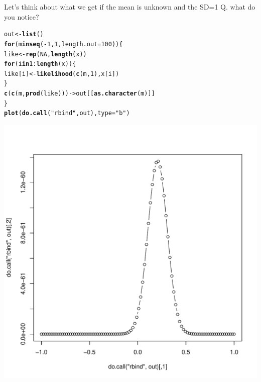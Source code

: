 \documentclass[letterpaper,12pt]{article}\usepackage[]{graphicx}\usepackage[]{color}
\makeatletter
\def\maxwidth{ %
  \ifdim\Gin@nat@width>\linewidth
    \linewidth
  \else
    \Gin@nat@width
  \fi
}
\newcommand{\hlnum}[1]{\textcolor[rgb]{0.686,0.059,0.569}{#1}}%
\newcommand{\hlstr}[1]{\textcolor[rgb]{0.192,0.494,0.8}{#1}}%
\newcommand{\hlopt}[1]{\textcolor[rgb]{0,0,0}{#1}}%
\newcommand{\hlstd}[1]{\textcolor[rgb]{0.345,0.345,0.345}{#1}}%
\newcommand{\hlkwa}[1]{\textcolor[rgb]{0.161,0.373,0.58}{\textbf{#1}}}%
\newcommand{\hlkwb}[1]{\textcolor[rgb]{0.69,0.353,0.396}{#1}}%
\newcommand{\hlkwc}[1]{\textcolor[rgb]{0.333,0.667,0.333}{#1}}%
\newcommand{\hlkwd}[1]{\textcolor[rgb]{0.737,0.353,0.396}{\textbf{#1}}}%
\newenvironment{kframe}{%
 \def\at@end@of@kframe{}%
 \ifinner\ifhmode%
  \def\at@end@of@kframe{\end{minipage}}%
  \begin{minipage}{\columnwidth}%
 \fi\fi%
 \def\FrameCommand##1{\hskip\@totalleftmargin \hskip-\fboxsep
 \colorbox{shadecolor}{##1}\hskip-\fboxsep
     \hskip-\linewidth \hskip-\@totalleftmargin \hskip\columnwidth}%
 \MakeFramed {\advance\hsize-\width
   \@totalleftmargin\z@ \linewidth\hsize
   \@setminipage}}%
 {\par\unskip\endMakeFramed%
 \at@end@of@kframe}
\newenvironment{knitrout}{}{} %
\numberwithin{equation}{section}
\makeatother
\begin{document}
Let's think about what we get if the mean is unknown and the SD=1
Q. what do you notice? 

\begin{knitrout}
\color{fgcolor}\begin{kframe}
\begin{alltt}
\hlstd{out}\hlkwb{<-}\hlkwd{list}\hlstd{()}
\hlkwa{for} \hlstd{(m} \hlkwa{in} \hlkwd{seq}\hlstd{(}\hlopt{-}\hlnum{1}\hlstd{,}\hlnum{1}\hlstd{,}\hlkwc{length.out}\hlstd{=}\hlnum{100}\hlstd{)) \{}
    \hlstd{like}\hlkwb{<-}\hlkwd{rep}\hlstd{(}\hlnum{NA}\hlstd{,}\hlkwd{length}\hlstd{(x))}
    \hlkwa{for} \hlstd{(i} \hlkwa{in} \hlnum{1}\hlopt{:}\hlkwd{length}\hlstd{(x)) \{}
        \hlstd{like[i]}\hlkwb{<-}\hlkwd{likelihood}\hlstd{(}\hlkwd{c}\hlstd{(m,}\hlnum{1}\hlstd{),x[i])}
    \hlstd{\}}
    \hlkwd{c}\hlstd{(}\hlkwd{c}\hlstd{(m,}\hlkwd{prod}\hlstd{(like)))}\hlkwb{->}\hlstd{out[[}\hlkwd{as.character}\hlstd{(m) ]]}
\hlstd{\}}
\hlkwd{plot}\hlstd{(}\hlkwd{do.call}\hlstd{(}\hlstr{"rbind"}\hlstd{,out),}\hlkwc{type}\hlstd{=}\hlstr{"b"}\hlstd{)}
\end{alltt}
\end{kframe}
\includegraphics[width=\maxwidth]{figure/unnamed-chunk-11-1} 

\end{knitrout}
\end{document}
